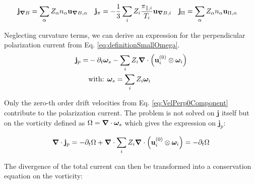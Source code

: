 \begin{align}
	\mathbf{j}_{\grad B} &= \sum_{\alpha} Z_\alpha n_\alpha \mathbf{u}_{\grad B,\alpha} & \mathbf{j}_{\pi} &= -\frac{1}{3}\sum_{i} Z_i  \frac{\pi_{\parallel,i}}{T_i} \mathbf{u}_{\grad B,i} & \mathbf{j}_{\Pi} &= \sum_{\alpha} Z_\alpha n_\alpha \mathbf{u}_{\Pi,\alpha}  	
\end{align}

Neglecting curvature terms, we can derive an expression for the perpendicular polarization current from Eq. \ref{eq:definitionSmallOmega}.
\begin{align}
	\mathbf{j}_{p} =& -\partial_t\boldsymbol{\omega}_s - \sum_{i}Z_i\grad\cdot\left(\mathbf{u}^{(0)}_i\otimes\boldsymbol{\omega}_i\right) \\
	&\text{with:  }\boldsymbol{\omega}_s = \sum_{i}Z_i\boldsymbol{\omega}_i \nonumber
\end{align}


 Only the zero-th order drift velocities from Eq. \ref{eq:VelPerp0Component} contribute to the polarization current. The problem is not solved on $\mathbf{j}$ itself but on the vorticity defined as $\Omega = \grad\cdot\boldsymbol{\omega}_s$ which gives the expression on $\mathbf{j}_p$: 
 
 \begin{equation}
 	\grad\cdot\mathbf{j}_p = -\partial_t\Omega + \grad\cdot\sum_{i}Z_i\grad\cdot\left(\mathbf{u}^{(0)}_i\otimes\boldsymbol{\omega}_i\right) = - \partial_t\Omega
 \end{equation}

The divergence of the total current can then be transformed into a conservation equation on the vorticity:

